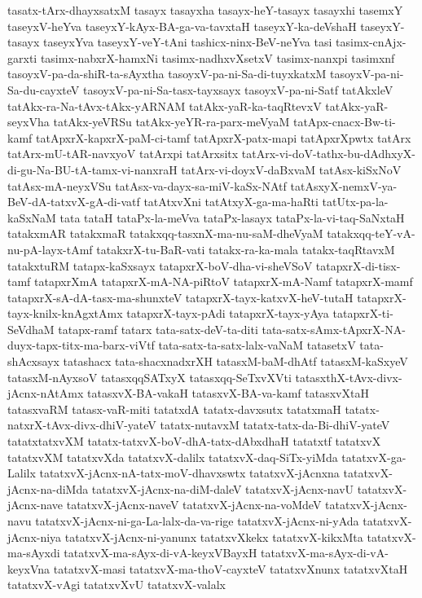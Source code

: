 {tasatx-tArx-dhayxsatxM
tasayx
tasayxha
tasayx-heY-tasayx
tasayxhi
tasemxY
taseyxV-heYva
taseyxY-kAyx-BA-ga-va-tavxtaH
taseyxY-ka-deVshaH
taseyxY-tasayx
taseyxYva
taseyxY-veY-tAni
tashicx-ninx-BeV-neYva
tasi
tasimx-cnAjx-garxti
tasimx-nabxrX-hamxNi
tasimx-nadhxvXsetxV
tasimx-nanxpi
tasimxnf
tasoyxV-pa-da-shiR-ta-sAyxtha
tasoyxV-pa-ni-Sa-di-tuyxkatxM
tasoyxV-pa-ni-Sa-du-cayxteV
tasoyxV-pa-ni-Sa-tasx-tayxsayx
tasoyxV-pa-ni-Satf
tatAkxleV
tatAkx-ra-Na-tAvx-tAkx-yARNAM
tatAkx-yaR-ka-taqRtevxV
tatAkx-yaR-seyxVha
tatAkx-yeVRSu
tatAkx-yeYR-ra-parx-meVyaM
tatApx-cnacx-Bw-ti-kamf
tatApxrX-kapxrX-paM-ci-tamf
tatApxrX-patx-mapi
tatApxrXpwtx
tatArx
tatArx-mU-tAR-navxyoV
tatArxpi
tatArxsitx
tatArx-vi-doV-tathx-bu-dAdhxyX-di-gu-Na-BU-tA-tamx-vi-nanxraH
tatArx-vi-doyxV-daBxvaM
tatAsx-kiSxNoV
tatAsx-mA-neyxVSu
tatAsx-va-dayx-sa-miV-kaSx-NAtf
tatAsxyX-nemxV-ya-BeV-dA-tatxvX-gA-di-vatf
tatAtxvXni
tatAtxyX-ga-ma-haRti
tatUtx-pa-la-kaSxNaM
tata
tataH
tataPx-la-meVva
tataPx-lasayx
tataPx-la-vi-taq-SaNxtaH
tatakxmAR
tatakxmaR
tatakxqq-tasxnX-ma-nu-saM-dheVyaM
tatakxqq-teY-vA-nu-pA-layx-tAmf
tatakxrX-tu-BaR-vati
tatakx-ra-ka-mala
tatakx-taqRtavxM
tatakxtuRM
tatapx-kaSxsayx
tatapxrX-boV-dha-vi-sheVSoV
tatapxrX-di-tisx-tamf
tatapxrXmA
tatapxrX-mA-NA-piRtoV
tatapxrX-mA-Namf
tatapxrX-mamf
tatapxrX-sA-dA-tasx-ma-shunxteV
tatapxrX-tayx-katxvX-heV-tutaH
tatapxrX-tayx-knilx-knAgxtAmx
tatapxrX-tayx-pAdi
tatapxrX-tayx-yAya
tatapxrX-ti-SeVdhaM
tatapx-ramf
tatarx
tata-satx-deV-ta-diti
tata-satx-sAmx-tApxrX-NA-duyx-tapx-titx-ma-barx-viVtf
tata-satx-ta-satx-lalx-vaNaM
tatasetxV
tata-shAcxsayx
tatashacx
tata-shacxnadxrXH
tatasxM-baM-dhAtf
tatasxM-kaSxyeV
tatasxM-nAyxsoV
tatasxqqSATxyX
tatasxqq-SeTxvXVti
tatasxthX-tAvx-divx-jAcnx-nAtAmx
tatasxvX-BA-vakaH
tatasxvX-BA-va-kamf
tatasxvXtaH
tatasxvaRM
tatasx-vaR-miti
tatatxdA
tatatx-davxsutx
tatatxmaH
tatatx-natxrX-tAvx-divx-dhiV-yateV
tatatx-nutavxM
tatatx-tatx-da-Bi-dhiV-yateV
tatatxtatxvXM
tatatx-tatxvX-boV-dhA-tatx-dAbxdhaH
tatatxtf
tatatxvX
tatatxvXM
tatatxvXda
tatatxvX-dalilx
tatatxvX-daq-SiTx-yiMda
tatatxvX-ga-Lalilx
tatatxvX-jAcnx-nA-tatx-moV-dhavxswtx
tatatxvX-jAcnxna
tatatxvX-jAcnx-na-diMda
tatatxvX-jAcnx-na-diM-daleV
tatatxvX-jAcnx-navU
tatatxvX-jAcnx-nave
tatatxvX-jAcnx-naveV
tatatxvX-jAcnx-na-voMdeV
tatatxvX-jAcnx-navu
tatatxvX-jAcnx-ni-ga-La-lalx-da-va-rige
tatatxvX-jAcnx-ni-yAda
tatatxvX-jAcnx-niya
tatatxvX-jAcnx-ni-yanunx
tatatxvXkekx
tatatxvX-kikxMta
tatatxvX-ma-sAyxdi
tatatxvX-ma-sAyx-di-vA-keyxVBayxH
tatatxvX-ma-sAyx-di-vA-keyxVna
tatatxvX-masi
tatatxvX-ma-thoV-cayxteV
tatatxvXnunx
tatatxvXtaH
tatatxvX-vAgi
tatatxvXvU
tatatxvX-valalx
}
